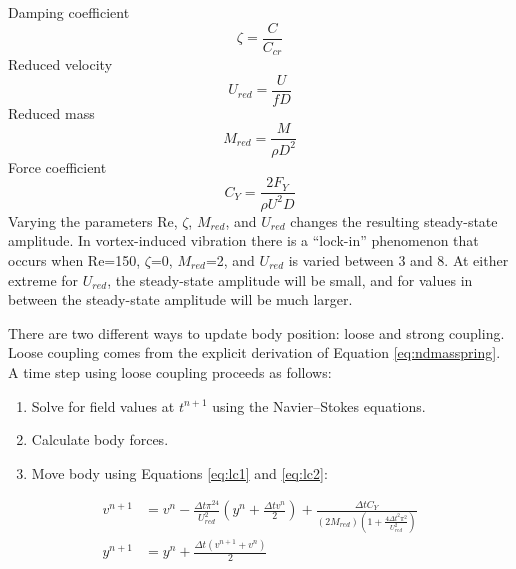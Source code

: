 Damping coefficient
\begin{equation}
\zeta=\frac{C}{C_{cr}}\label{eq:damping coefficient}
\end{equation}
Reduced velocity
\begin{equation}
U_{red}=\frac{U}{fD}\label{eq:reduced velocity}
\end{equation}
Reduced mass
\begin{equation}
M_{red}=\frac{M}{\rho D^2}\label{eq:reduced mass}
\end{equation}
Force coefficient
\begin{equation}
C_Y=\frac{2F_Y}{\rho U^2 D}\label{eq:force coefficient}
\end{equation}
Varying the parameters Re, $\zeta$, $M_{red}$, and $U_{red}$ changes the resulting steady-state amplitude. 
In vortex-induced vibration there is a ``lock-in'' phenomenon that occurs when Re=150, $\zeta$=0, $M_{red}$=2, and $U_{red}$ is varied between 3 and 8. 
At either extreme for $U_{red}$, the steady-state amplitude will be small, and for values in between the steady-state amplitude will be much larger. 

There are two different ways to update body position: loose and strong coupling. 
Loose coupling comes from the explicit derivation of Equation \eqref{eq:ndmasspring}.
A time step using loose coupling proceeds as follows:
\begin{enumerate}
	\item Solve for field values at $t^{n+1}$ using the Navier--Stokes equations.
	\item Calculate body forces.
	\item Move body using Equations \eqref{eq:lc1} and \eqref{eq:lc2}:
\end{enumerate}
\begin{align}
v^{n+1} &= v^n-\frac{\Delta t\pi^24}{U_{red}^2}\left(y^n+\frac{\Delta tv^n}{2}\right) + \frac{\Delta tC_Y}{\left(2M_{red}\right)\left(1+\frac{4\Delta t^2\pi^2}{U_{red}^2}\right)} \label{eq:lc1} \\
y^{n+1} &= y^n +\frac{\Delta t\left(v^{n+1}+v^n\right)}{2}\; \label{eq:lc2}
\end{align}

